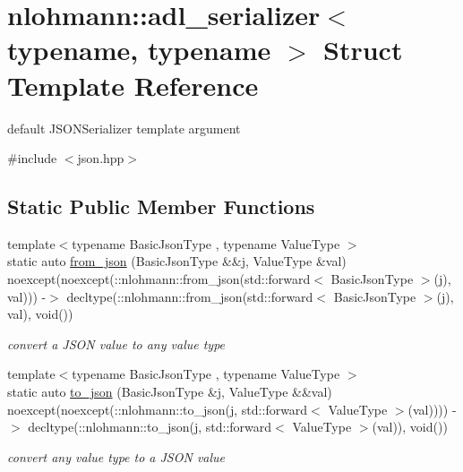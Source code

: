 \hypertarget{structnlohmann_1_1adl__serializer}{}\section{nlohmann\+:\+:adl\+\_\+serializer$<$ typename, typename $>$ Struct Template Reference}
\label{structnlohmann_1_1adl__serializer}


default J\+S\+O\+N\+Serializer template argument  




{\ttfamily \#include $<$json.\+hpp$>$}

\subsection*{Static Public Member Functions}
\begin{DoxyCompactItemize}
\item 
{\footnotesize template$<$typename Basic\+Json\+Type , typename Value\+Type $>$ }\\static auto \mbox{\hyperlink{structnlohmann_1_1adl__serializer_a2c544585b8b1828a0f1eecd831d0496e}{from\+\_\+json}} (Basic\+Json\+Type \&\&j, Value\+Type \&val) noexcept(noexcept(\+::nlohmann\+::from\+\_\+json(std\+::forward$<$ Basic\+Json\+Type $>$(j), val))) -\/$>$ decltype(\+::nlohmann\+::from\+\_\+json(std\+::forward$<$ Basic\+Json\+Type $>$(j), val), void())
\begin{DoxyCompactList}\small\item\em convert a J\+S\+ON value to any value type \end{DoxyCompactList}\item 
{\footnotesize template$<$typename Basic\+Json\+Type , typename Value\+Type $>$ }\\static auto \mbox{\hyperlink{structnlohmann_1_1adl__serializer_a01b867bd5dce5249d4f7433b8f27def6}{to\+\_\+json}} (Basic\+Json\+Type \&j, Value\+Type \&\&val) noexcept(noexcept(\+::nlohmann\+::to\+\_\+json(j, std\+::forward$<$ Value\+Type $>$(val)))) -\/$>$ decltype(\+::nlohmann\+::to\+\_\+json(j, std\+::forward$<$ Value\+Type $>$(val)), void())
\begin{DoxyCompactList}\small\item\em convert any value type to a J\+S\+ON value \end{DoxyCompactList}\end{DoxyCompactItemize}


